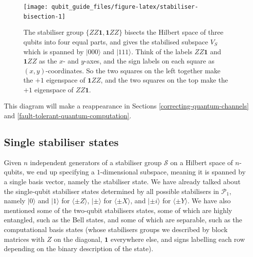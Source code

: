 \documentclass[fleqn,a4paper]{article}
\theoremstyle{definition}
\theoremstyle{definition}
\theoremstyle{definition}
\theoremstyle{definition}
\theoremstyle{remark}
\begin{document}
\begin{figure}[H]

{\centering \texttt{[image: qubit\_guide\_files/figure-latex/stabiliser-bisection-1]} 

}

\caption{The stabiliser group \(\{ZZ\mathbf{1},\mathbf{1}ZZ\}\) bisects the Hilbert space of three qubits into four equal parts, and gives the stabilised subspace \(V_S\) which is spanned by \(|000\rangle\) and \(|111\rangle\). Think of the labels \(ZZ\mathbf{1}\) and \(\mathbf{1}ZZ\) as the \(x\)- and \(y\)-axes, and the sign labels on each square as \((x,y)\)-coordinates. So the two squares on the left together make the \(+1\) eigenspace of \(\mathbf{1}ZZ\), and the two squares on the top make the \(+1\) eigenspace of \(ZZ\mathbf{1}\).}\label{fig:stabiliser-bisection}
\end{figure}

This diagram will make a reappearance in Sections \ref{correcting-quantum-channels} and \ref{fault-tolerant-quantum-computation}.

\hypertarget{single-stabiliser-states}{%
\subsection{Single stabiliser states}\label{single-stabiliser-states}}

Given \(n\) independent generators of a stabiliser group \(\mathcal{S}\) on a Hilbert space of \(n\)-qubits, we end up specifying a \(1\)-dimensional subspace, meaning it is spanned by a single basis vector, namely the stabiliser state.
We have already talked about the single-qubit stabiliser states determined by all possible stabilisers in \(\mathcal{P}_1\), namely \(|0\rangle\) and \(|1\rangle\) for \(\langle \pm Z\rangle\), \(|\pm\rangle\) for \(\langle \pm X\rangle\), and \(|\pm i\rangle\) for \(\langle \pm Y\rangle\).
We have also mentioned some of the two-qubit stabilisers states, some of which are highly entangled, such as the Bell states, and some of which are separable, such as the computational basis states (whose stabilisers groups we described by block matrices with \(Z\) on the diagonal, \(\mathbf{1}\) everywhere else, and signs labelling each row depending on the binary description of the state).
\end{document}
